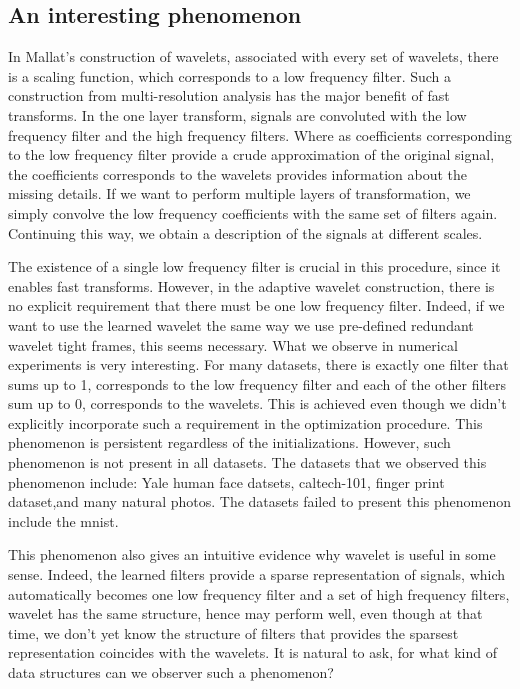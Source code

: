 \documentclass[a4paper]{article}
\begin{document}
\subsection{An interesting phenomenon}
In Mallat's construction of wavelets, associated with every set of wavelets, there is a scaling function, which corresponds to a low frequency filter. Such a construction from multi-resolution analysis has the major benefit of fast transforms. In the one layer transform, signals are convoluted with the low frequency filter and the high frequency filters. Where as coefficients corresponding to the low frequency filter provide a crude approximation of the original signal, the coefficients corresponds to the wavelets provides information about the missing details. If we want to perform multiple layers of transformation, we simply convolve the low frequency coefficients with the same set of filters again. Continuing this way, we obtain a description of the signals at different scales. 

The existence of a single low frequency filter is crucial in this procedure, since it enables fast transforms. However, in the adaptive wavelet construction, there is no explicit requirement that there must be one low frequency filter. Indeed, if we want to use the learned wavelet the same way we use pre-defined redundant wavelet tight frames, this seems necessary. What we observe in numerical experiments is very interesting. For many datasets, there is exactly one filter that sums up to 1, corresponds to the low frequency filter and each of the other filters sum up to 0, corresponds to the wavelets. This is achieved even though we didn't explicitly incorporate such a requirement in the optimization procedure. This phenomenon is persistent regardless of the initializations. However, such phenomenon is not present in all datasets. The datasets that we observed this phenomenon include: Yale human face datsets, caltech-101, finger print dataset,and many natural photos. The datasets failed to present this phenomenon include the mnist.  

This phenomenon also gives an intuitive evidence why wavelet is useful in some sense. Indeed, the learned filters provide a sparse representation of signals, which automatically becomes one low frequency filter and a set of high frequency filters, wavelet has the same structure, hence may perform well, even though at that time, we don't yet know the structure of  filters that provides the sparsest representation coincides with the wavelets. It is natural to ask, for what kind of data structures can we observer such a phenomenon?
\end{document}

